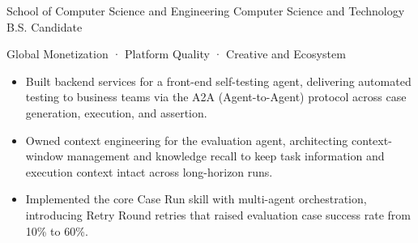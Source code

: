 School of Computer Science and Engineering \quad Computer Science and Technology \hfill B.S. Candidate

Global Monetization · Platform Quality · Creative and Ecosystem
\begin{itemize}
  \item Built backend services for a front-end self-testing agent, delivering automated testing to business teams via the A2A (Agent-to-Agent) protocol across case generation, execution, and assertion.
  \item Owned context engineering for the evaluation agent, architecting context-window management and knowledge recall to keep task information and execution context intact across long-horizon runs.
  \item Implemented the core Case Run skill with multi-agent orchestration, introducing Retry Round retries that raised evaluation case success rate from 10\% to 60\%.
\end{itemize}

